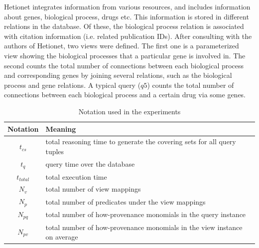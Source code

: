 Hetionet integrates information from various resources, and includes information about genes, biological process, drugs etc.  This information is stored in different relations in the database. Of these, the biological process relation is associated with citation information (i.e. related publication IDs). After consulting with the authors of Hetionet, two views were defined. The first one is a parameterized view showing the  biological processes that a particular gene is involved in. The second counts the total number of connections between each biological process and corresponding genes by joining several relations, such as the biological process and gene relations.  A typical query ($q5$) counts the total number of connections between each biological process and a certain drug via some genes.


\begin{table}
\centering
\caption{Notation used in the experiments}
\small
\vspace*{-0.2cm}
\begin{tabular}[!h]{|c|>{\centering\arraybackslash}p{6.8cm}|} \hline
Notation & Meaning \\ \hline
$t_{cs}$&total reasoning time to generate the covering sets for all query tuples \\ \hline
$t_{q}$&query time over the database \\ \hline
$t_{total}$&total execution time \\ \hline
$N_v$&total number of view mappings \\ \hline
$N_p$&total number of predicates under the view mappings \\ \hline
$N_{pq}$&total number of how-provenance monomials in the query instance \\ \hline
$N_{pv}$&total number of how-provenance monomials in the view instance on average\\ \hline
\end{tabular}
\label{Table: notation_summary}
\end{table}


